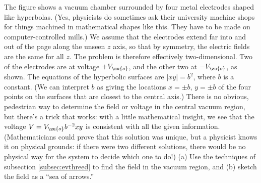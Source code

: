         The figure shows a vacuum chamber surrounded by four metal electrodes shaped
        like hyperbolas. (Yes, physicists do sometimes ask their university machine
        shops for things machined in mathematical shapes like this. They have to be made
        on computer-controlled mills.) We assume that the
        electrodes extend far into and out of the page along the unseen $z$ axis, so
        that by symmetry, the electric fields are the same for all $z$. The problem is
        therefore effectively two-dimensional. Two of the electrodes are at voltage $+V_\zu{o}$,
        and the other two at $-V_\zu{o}$, as shown. The equations of the hyperbolic surfaces
        are $|xy|=b^2$, where $b$ is a constant. (We can interpret $b$ as giving the locations
        $x=\pm b$, $y=\pm b$ of the four points on the surfaces that are closest to the
        central axis.) There is no obvious, pedestrian way to
        determine the field or voltage in the central vacuum region, but there's a trick that
        works: with a little mathematical insight, we see that the voltage $V=V_\zu{o}b^{-2}xy$
        is consistent with all the given information. (Mathematicians could prove that this
        solution was unique, but a physicist knows it on physical grounds: if there were two
        different solutions, there would be no physical way for the system to decide which
        one to do!) (a) Use the techniques of subsection \ref{subsec:evthreed}
        to find the field in the vacuum region, and (b) sketch the field as a ``sea of arrows.''\answercheck
